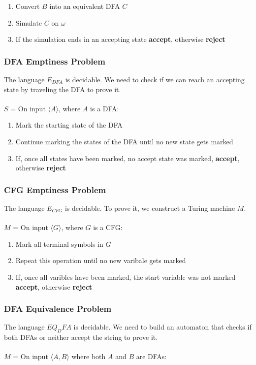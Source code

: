 \documentclass{article}
\begin{document}
\begin{enumerate}
	\item Convert $B$ into an equivalent DFA $C$
	\item Simulate $C$ on $\omega$
	\item If the simulation ends in an accepting state \textbf{accept}, otherwise \textbf{reject}
\end{enumerate}

\subsubsection{DFA Emptiness Problem}
The language $E_{DFA}$ is decidable. We need to check if we can reach an accepting state by traveling the DFA to prove it. \\ \\
$S$ = On input $\langle A \rangle$, where $A$ is a DFA:

\begin{enumerate}
	\item Mark the starting state of the DFA
	\item Continue marking the states of the DFA until no new state gets marked
	\item If, once all states have been marked, no accept state was marked, \textbf{accept}, otherwise \textbf{reject}
\end{enumerate}

\subsubsection{CFG Emptiness Problem}
The language $E_{CFG}$ is decidable. To prove it, we construct a Turing machine $M$. \\ \\
$M$ = On input $\langle G \rangle$, where $G$ is a CFG:

\begin{enumerate}
	\item Mark all terminal symbols in $G$
	\item Repeat this operation until no new varibale gets marked
	\item If, once all varibles have been marked, the start variable was not marked \textbf{accept}, otherwise \textbf{reject}
\end{enumerate}

\subsubsection{DFA Equivalence Problem}
The language $EQ_DFA$ is decidable. We need to build an automaton that checks if both DFAs or neither accept the string to prove it. \\ \\
$M$ = On input $\langle A, B \rangle$ where both $A$ and $B$ are DFAs:
\end{document}
